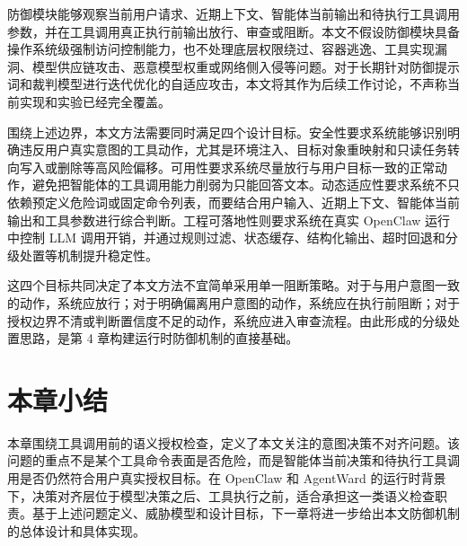 防御模块能够观察当前用户请求、近期上下文、智能体当前输出和待执行工具调用参数，并在工具调用真正执行前输出放行、审查或阻断。本文不假设防御模块具备操作系统级强制访问控制能力，也不处理底层权限绕过、容器逃逸、工具实现漏洞、模型供应链攻击、恶意模型权重或网络侧入侵等问题。对于长期针对防御提示词和裁判模型进行迭代优化的自适应攻击，本文将其作为后续工作讨论，不声称当前实现和实验已经完全覆盖。

围绕上述边界，本文方法需要同时满足四个设计目标。安全性要求系统能够识别明确违反用户真实意图的工具动作，尤其是环境注入、目标对象重映射和只读任务转向写入或删除等高风险偏移。可用性要求系统尽量放行与用户目标一致的正常动作，避免把智能体的工具调用能力削弱为只能回答文本。动态适应性要求系统不只依赖预定义危险词或固定命令列表，而要结合用户输入、近期上下文、智能体当前输出和工具参数进行综合判断。工程可落地性则要求系统在真实 OpenClaw 运行中控制 LLM 调用开销，并通过规则过滤、状态缓存、结构化输出、超时回退和分级处置等机制提升稳定性。

这四个目标共同决定了本文方法不宜简单采用单一阻断策略。对于与用户意图一致的动作，系统应放行；对于明确偏离用户意图的动作，系统应在执行前阻断；对于授权边界不清或判断置信度不足的动作，系统应进入审查流程。由此形成的分级处置思路，是第 4 章构建运行时防御机制的直接基础。

\section{本章小结}

本章围绕工具调用前的语义授权检查，定义了本文关注的意图决策不对齐问题。该问题的重点不是某个工具命令表面是否危险，而是智能体当前决策和待执行工具调用是否仍然符合用户真实授权目标。在 OpenClaw 和 AgentWard 的运行时背景下，决策对齐层位于模型决策之后、工具执行之前，适合承担这一类语义检查职责。基于上述问题定义、威胁模型和设计目标，下一章将进一步给出本文防御机制的总体设计和具体实现。
